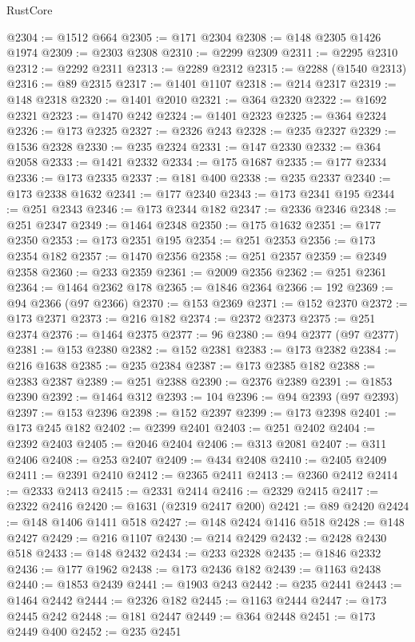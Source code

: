 \begin{lexlean}{RustCore}
\begin{coremodule}
@2304 := @1512 @664
@2305 := @171 @2304
@2308 := @148 @2305 @1426 @1974
@2309 := @2303 @2308
@2310 := @2299 @2309
@2311 := @2295 @2310
@2312 := @2292 @2311
@2313 := @2289 @2312
@2315 := @2288 (@1540 @2313)
@2316 := @89 @2315
@2317 := @1401 @1107
@2318 := @214 @2317
@2319 := @148 @2318
@2320 := @1401 @2010
@2321 := @364 @2320
@2322 := @1692 @2321
@2323 := @1470 @242
@2324 := @1401 @2323
@2325 := @364 @2324
@2326 := @173 @2325
@2327 := @2326 @243
@2328 := @235 @2327
@2329 := @1536 @2328
@2330 := @235 @2324
@2331 := @147 @2330
@2332 := @364 @2058
@2333 := @1421 @2332
@2334 := @175 @1687
@2335 := @177 @2334
@2336 := @173 @2335
@2337 := @181 @400
@2338 := @235 @2337
@2340 := @173 @2338 @1632
@2341 := @177 @2340
@2343 := @173 @2341 @195
@2344 := @251 @2343
@2346 := @173 @2344 @182
@2347 := @2336 @2346
@2348 := @251 @2347
@2349 := @1464 @2348
@2350 := @175 @1632
@2351 := @177 @2350
@2353 := @173 @2351 @195
@2354 := @251 @2353
@2356 := @173 @2354 @182
@2357 := @1470 @2356
@2358 := @251 @2357
@2359 := @2349 @2358
@2360 := @233 @2359
@2361 := @2009 @2356
@2362 := @251 @2361
@2364 := @1464 @2362 @178
@2365 := @1846 @2364
@2366 := 192
@2369 := @94 @2366 (@97 @2366)
@2370 := @153 @2369
@2371 := @152 @2370
@2372 := @173 @2371
@2373 := @216 @182
@2374 := @2372 @2373
@2375 := @251 @2374
@2376 := @1464 @2375
@2377 := 96
@2380 := @94 @2377 (@97 @2377)
@2381 := @153 @2380
@2382 := @152 @2381
@2383 := @173 @2382
@2384 := @216 @1638
@2385 := @235 @2384
@2387 := @173 @2385 @182
@2388 := @2383 @2387
@2389 := @251 @2388
@2390 := @2376 @2389
@2391 := @1853 @2390
@2392 := @1464 @312
@2393 := 104
@2396 := @94 @2393 (@97 @2393)
@2397 := @153 @2396
@2398 := @152 @2397
@2399 := @173 @2398
@2401 := @173 @245 @182
@2402 := @2399 @2401
@2403 := @251 @2402
@2404 := @2392 @2403
@2405 := @2046 @2404
@2406 := @313 @2081
@2407 := @311 @2406
@2408 := @253 @2407
@2409 := @434 @2408
@2410 := @2405 @2409
@2411 := @2391 @2410
@2412 := @2365 @2411
@2413 := @2360 @2412
@2414 := @2333 @2413
@2415 := @2331 @2414
@2416 := @2329 @2415
@2417 := @2322 @2416
@2420 := @1631 (@2319 @2417 @200)
@2421 := @89 @2420
@2424 := @148 @1406 @1411 @518
@2427 := @148 @2424 @1416 @518
@2428 := @148 @2427
@2429 := @216 @1107
@2430 := @214 @2429
@2432 := @2428 @2430 @518
@2433 := @148 @2432
@2434 := @233 @2328
@2435 := @1846 @2332
@2436 := @177 @1962
@2438 := @173 @2436 @182
@2439 := @1163 @2438
@2440 := @1853 @2439
@2441 := @1903 @243
@2442 := @235 @2441
@2443 := @1464 @2442
@2444 := @2326 @182
@2445 := @1163 @2444
@2447 := @173 @2445 @242
@2448 := @181 @2447
@2449 := @364 @2448
@2451 := @173 @2449 @400
@2452 := @235 @2451

\end{coremodule}
\end{lexlean}
